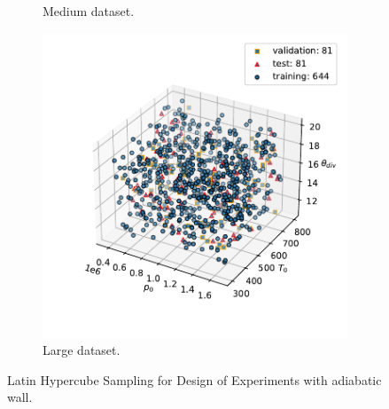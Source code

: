 \begin{figure}[t]
\begin{subfigure}{0.3\textwidth}
        \caption{Medium dataset.}
        \label{fig:lhs_adiabatic_500}
    \end{subfigure}
    \begin{subfigure}{0.3\textwidth}
        \centering
        \includegraphics[width=\linewidth]{Figuras/lhs/data_adiabatic/doe_1000/lhs_all.pdf}  
        \caption{Large dataset.}
        \label{fig:lhs_adiabatic_1000}
    \end{subfigure}
    \caption{Latin Hypercube Sampling for Design of Experiments with adiabatic wall.}
    \label{fig:lhs_adiabatic}
\end{figure}

